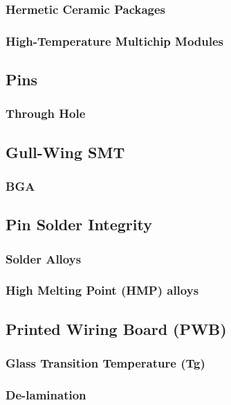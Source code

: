 \documentclass{article}
\begin{document}
		\subsubsection{Hermetic Ceramic Packages}
		\subsubsection{High-Temperature Multichip Modules}
	
	\subsection{Pins}
		\subsubsection{Through Hole}
		\subsection{Gull-Wing SMT}
		\subsubsection{BGA}
	
	\subsection{Pin Solder Integrity}
		\subsubsection{Solder Alloys}
		\subsubsection{High Melting Point (HMP) alloys}
	
	\subsection{Printed Wiring Board (PWB)}
		\subsubsection{Glass Transition Temperature (Tg)}
		\subsubsection{De-lamination}
\end{document}
